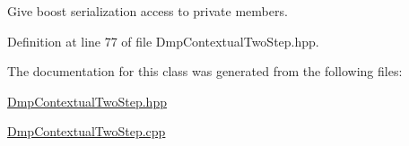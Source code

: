 Give boost serialization access to private members. 



Definition at line 77 of file Dmp\+Contextual\+Two\+Step.\+hpp.



The documentation for this class was generated from the following files\+:\begin{DoxyCompactItemize}
\item 
\hyperlink{DmpContextualTwoStep_8hpp}{Dmp\+Contextual\+Two\+Step.\+hpp}\item 
\hyperlink{DmpContextualTwoStep_8cpp}{Dmp\+Contextual\+Two\+Step.\+cpp}\end{DoxyCompactItemize}
